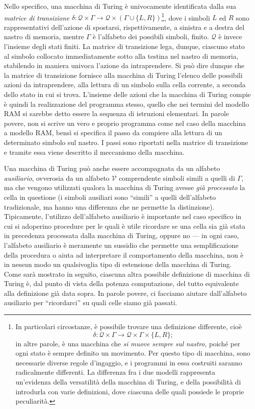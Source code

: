 \documentclass[10pt]{\classname}
\theoremstyle{newlinethm}
\theoremstyle{theorem}
\theoremstyle{definition}
\theoremstyle{definition}
\theoremstyle{definition}
\theoremstyle{definition}
\begin{document}
Nello specifico, una macchina di Turing è univocamente identificata dalla sua
\emph{matrice di transizione} $\delta  : \mathcal Q \times \Gamma \rightarrow
\mathcal Q \times (\Gamma \cup \{L,R\})$\footnote{In particolari circostanze, è
possibile trovare una definizione differente, cioè $$\delta  : \mathcal Q \times
\Gamma \rightarrow \mathcal Q \times \Gamma \times \{L,R\};$$ in altre parole, è
una macchina che \emph{si muove sempre sul nastro,} poiché per ogni stato è
sempre definito un movimento. Per questo tipo di macchina, sono necessarie
diverse regole d'ingaggio, e i programmi in essa costruiti saranno radicalmente
differenti. La differenza fra i due modelli rappresenta un'evidenza della
versatilità della macchina di Turing, e della possibilità di introdurla con
varie definizioni, dove ciascuna delle quali possiede le proprie peculiarità.},
dove i simboli $L$ ed $R$ sono rappresentativi dell'azione di spostarsi,
rispettivamente, a sinistra e a destra del nastro di memoria, mentre $\Gamma$ è
l'alfabeto dei possibili simboli, finito. $\mathcal Q$ è invece l'insieme degli
stati finiti. La matrice di transizione lega, dunque, ciascuno stato al simbolo
collocato immediatamente sotto alla testina nel nastro di memoria, stabilendo
in maniera univoca l'azione da intraprendere. Si può dire dunque che la matrice
di transizione fornisce alla macchina di Turing l'elenco delle possibili azioni
da intraprendere, alla lettura di un simbolo sulla cella corrente, a seconda
dello stato in cui si trova. L'insieme delle azioni che la macchina di Turing
compie è quindi la realizzazione del programma stesso, quello che nei termini
del modello RAM si sarebbe detto essere la sequenza di istruzioni elementari.
In parole povere, non si scrive un vero e proprio programma come nel caso della
macchina a modello RAM, bensì si specifica il passo da compiere alla lettura di
un determinato simbolo sul nastro. I passi sono riportati nella matrice di
transizione e tramite essa viene descritto il meccanismo della macchina.

Una macchina di Turing può anche essere accompagnata da un alfabeto
\emph{ausiliario}, ovverosia da un alfabeto $\mathcal V$ comprendente simboli
simili a quelli di $\Gamma$, ma che vengono utilizzati qualora la macchina di
Turing avesse \emph{già processato} la cella in questione (i simboli ausiliari
sono ``simili'' a quelli dell'alfabeto tradizionale, ma hanno una differenza
che ne permette la distinzione). Tipicamente, l'utilizzo dell'alfabeto
ausiliario è importante nel caso specifico in cui si adoperino procedure per le
quali è utile ricordare se una cella sia già stata in precedenza processata
dalla macchina di Turing, oppure no --- in ogni caso, l'alfabeto ausiliario è
meramente un sussidio che permette una semplificazione della procedura o aiuta
ad interpretare il comportamento della macchina, non è in nessun modo un
qualsivoglia tipo di estensione della macchina di Turing. Come sarà mostrato in
seguito, ciascuna altra possibile definizione di macchina di Turing è, dal
punto di vista della potenza computazione, del tutto equivalente alla
definizione già data sopra. In parole povere, ci facciamo aiutare dall'alfabeto
ausiliario per ``ricordarci'' su quali celle siamo già passati.
\end{document}
